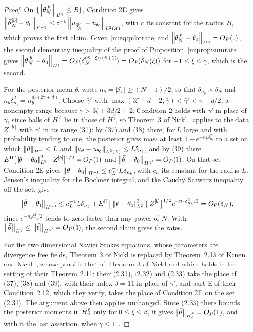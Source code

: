 \begin{proof}
On $\{\left\|\bar\theta^{[b]}_N\right\|_{H^{\bar\gamma}}\le B\}$, Condition 2E gives $\left\|\bar\theta^{[b]}_N-\theta_0\right\|_{H^{-1}}\le c^{-1}\left\|u_{\bar\theta^{[b]}_N}-u_{\theta_0}\right\|_{L^2(\mathcal X)}$, with $c$ its constant for the radius $B$, which proves the first claim. Given \eqref{m:eq:pilotrate} and $\left\|\bar\theta^{[b]}_N-\theta_0\right\|_{H^{\bar\gamma}}=O_P(1)$, the second elementary inequality of the proof of Proposition~\ref{m:prop:sumrate} gives $\left\|\bar\theta^{[b]}_N-\theta_0\right\|_{H^\xi}=O_P(\delta_N^{(\bar\gamma-\xi)/(\bar\gamma+1)})=O_P(\tilde\delta_N(\xi))$ for $-1\le\xi\le\bar\gamma$, which is the second.

For the posterior mean $\bar\theta$, write $n_b=|\mathcal I_b|\ge(N-1)/2$, so that $\delta_{n_b}\asymp\delta_N$ and $n_b\delta^2_{n_b}=n_b^{d/(2\gamma+d)}$. Choose $\bar\gamma'$ with $\max(3\zeta+d+2,\bar\gamma)<\bar\gamma'<\gamma-d/2$, a nonempty range because $\gamma>3\zeta+3d/2+2$. Condition 2 holds with $\bar\gamma'$ in place of $\bar\gamma$, since balls of $H^{\bar\gamma'}$ lie in those of $H^{\bar\gamma}$, so Theorem~3 of Nickl~\cite{nicklbvm2024} applies to the data $Z^{[b]}$ with $\bar\gamma'$ in its range (31): by (37) and (38) there, for $L$ large and with probability tending to one, the posterior gives mass at least $1-e^{-n_b\delta^2_{n_b}}$ to a set on which $\left\|\theta\right\|_{H^{\bar\gamma'}}\le L$ and $\left\|u_\theta-u_{\theta_0}\right\|_{L^2(\mathcal X)}\le L\delta_{n_b}$, and by (39) there $E^\Pi[\left\|\theta-\theta_0\right\|^2_{L^2}\mid Z^{[b]}]^{1/2}=O_P(1)$ and $\left\|\bar\theta-\theta_0\right\|_{H^{\bar\gamma'}}=O_P(1)$. On that set Condition 2E gives $\left\|\theta-\theta_0\right\|_{H^{-1}}\le c_L^{-1}L\delta_{n_b}$, with $c_L$ its constant for the radius $L$. Jensen's inequality for the Bochner integral, and the Cauchy Schwarz inequality off the set, give
\[
\left\|\bar\theta-\theta_0\right\|_{H^{-1}}\le c_L^{-1}L\delta_{n_b}+E^\Pi\big[\left\|\theta-\theta_0\right\|^2_{L^2}\mid Z^{[b]}\big]^{1/2}e^{-n_b\delta^2_{n_b}/2}=O_P(\delta_N),
\]
since $e^{-n_b\delta^2_{n_b}/2}$ tends to zero faster than any power of $N$. With $\left\|\bar\theta\right\|_{H^{\bar\gamma}}\le\left\|\bar\theta\right\|_{H^{\bar\gamma'}}=O_P(1)$, the second claim gives the rates.

For the two dimensional Navier Stokes equations, whose parameters are divergence free fields, Theorem~3 of Nickl is replaced by Theorem~2.13 of Konen and Nickl~\cite{konennickl2026}, whose proof is that of Theorem~3 of Nickl and which holds in the setting of their Theorem~2.11: their (2.31), (2.32) and (2.33) take the place of (37), (38) and (39), with their index $\beta=11$ in place of $\bar\gamma'$, and part E of their Condition~2.12, which they verify, takes the place of Condition 2E on the set (2.31). The argument above then applies unchanged. Since (2.33) there bounds the posterior moments in $\dot H^{\xi}_\diamond$ only for $0\le\xi\le\beta$, it gives $\left\|\bar\theta\right\|_{\dot H^{\bar\gamma}_\diamond}=O_P(1)$, and with it the last assertion, when $\bar\gamma\le11$.
\end{proof}

